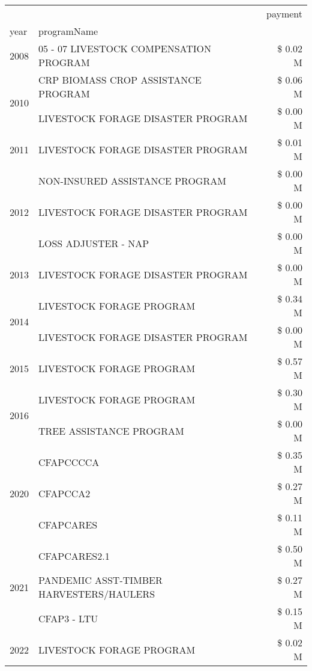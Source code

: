 \begin{tabular}{llr}
\toprule
 &  & payment \\
year & programName &  \\
\midrule
2008 & 05 - 07 LIVESTOCK COMPENSATION PROGRAM & \$ 0.02 M \\
\cline{1-3}
\multirow[t]{2}{*}{2010} & CRP BIOMASS CROP ASSISTANCE PROGRAM & \$ 0.06 M \\
 & LIVESTOCK FORAGE DISASTER PROGRAM & \$ 0.00 M \\
\cline{1-3}
2011 & LIVESTOCK FORAGE DISASTER PROGRAM & \$ 0.01 M \\
\cline{1-3}
\multirow[t]{3}{*}{2012} & NON-INSURED ASSISTANCE PROGRAM & \$ 0.00 M \\
 & LIVESTOCK FORAGE DISASTER PROGRAM & \$ 0.00 M \\
 & LOSS ADJUSTER - NAP & \$ 0.00 M \\
\cline{1-3}
2013 & LIVESTOCK FORAGE DISASTER PROGRAM & \$ 0.00 M \\
\cline{1-3}
\multirow[t]{2}{*}{2014} & LIVESTOCK FORAGE PROGRAM & \$ 0.34 M \\
 & LIVESTOCK FORAGE DISASTER PROGRAM & \$ 0.00 M \\
\cline{1-3}
2015 & LIVESTOCK FORAGE PROGRAM & \$ 0.57 M \\
\cline{1-3}
\multirow[t]{2}{*}{2016} & LIVESTOCK FORAGE PROGRAM & \$ 0.30 M \\
 & TREE ASSISTANCE PROGRAM & \$ 0.00 M \\
\cline{1-3}
\multirow[t]{3}{*}{2020} & CFAPCCCCA & \$ 0.35 M \\
 & CFAPCCA2 & \$ 0.27 M \\
 & CFAPCARES & \$ 0.11 M \\
\cline{1-3}
\multirow[t]{3}{*}{2021} & CFAPCARES2.1 & \$ 0.50 M \\
 & PANDEMIC ASST-TIMBER HARVESTERS/HAULERS & \$ 0.27 M \\
 & CFAP3 - LTU & \$ 0.15 M \\
\cline{1-3}
2022 & LIVESTOCK FORAGE PROGRAM & \$ 0.02 M \\
\cline{1-3}
\bottomrule
\end{tabular}
